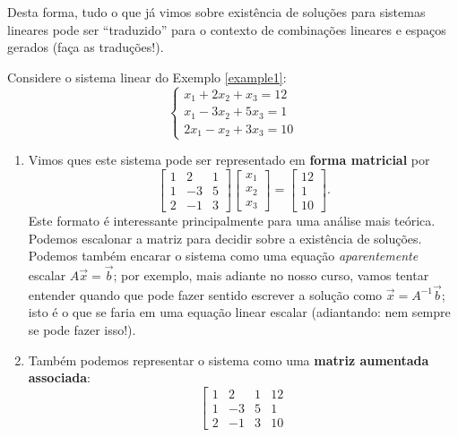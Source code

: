 \documentclass[../livro.tex]{subfiles}  %
\begin{document}
Desta forma, tudo o que já vimos sobre existência de soluções para sistemas lineares pode ser ``traduzido'' para o contexto de combinações lineares e espaços gerados (faça as traduções!).


\begin{example}
Considere o sistema linear do Exemplo \ref{example1}:
\begin{equation}
\left\{
\begin{array}{ll}
x_1 + 2x_2 + x_3 = 12 \\
x_1 -3x_2 + 5x_3 = 1 \\
2x_1 - x_2 + 3x_3 = 10
\end{array}
\right.
\end{equation} 
\begin{enumerate}[$(i)$]
\item Vimos ques este sistema pode ser representado em \textbf{forma matricial} por
\begin{equation}
\left[
\begin{array}{ccc}
1 &  2 & 1  \\
1 & -3 & 5  \\
2 & -1 & 3
\end{array}
\right]
\left[
\begin{array}{c}
x_1   \\
x_2  \\
x_3
\end{array}
\right] =
\left[
\begin{array}{c}
12   \\
1  \\
10
\end{array}
\right].
\end{equation} Este formato é interessante principalmente para uma análise mais teórica. Podemos escalonar a matriz para decidir sobre a existência de soluções. Podemos também encarar o sistema como uma equação \textit{aparentemente} escalar $A \vec{x} = \vec{b}$; por exemplo, mais adiante no nosso curso, vamos tentar entender quando que pode fazer sentido escrever a solução como $\vec{x} = A^{-1} \vec{b}$; isto é o que se faria em uma equação linear escalar (adiantando: nem sempre se pode fazer isso!).
\item Também podemos representar o sistema como uma \textbf{matriz aumentada associada}:
\begin{equation}
\left[
\begin{array}{ccc|c}
1 &  2 & 1 & 12 \\
1 & -3 & 5 &  1 \\
2 & -1 & 3 & 10

\end{array}
\end{equation}
\end{enumerate}
\end{example}
\end{document}
